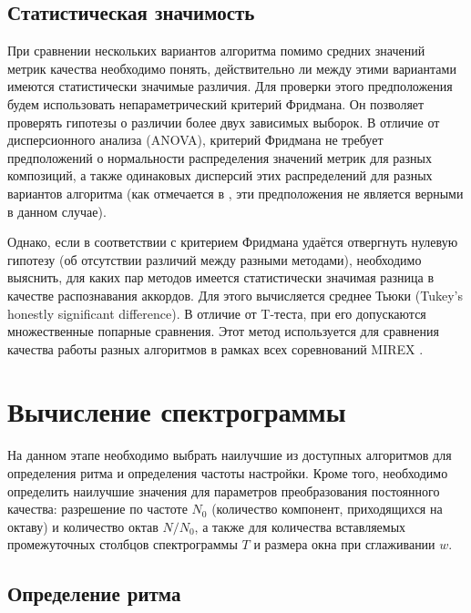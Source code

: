 \subsection{Статистическая значимость}

При сравнении нескольких вариантов алгоритма помимо средних значений метрик
качества необходимо понять, действительно ли между этими вариантами имеются
статистически значимые различия. Для проверки этого предположения будем
использовать непараметрический критерий Фридмана. Он позволяет проверять
гипотезы о различии более двух зависимых выборок. В отличие от дисперсионного
анализа (ANOVA), критерий Фридмана не требует предположений о нормальности
распределения значений метрик для разных композиций, а также одинаковых
дисперсий этих распределений для разных вариантов алгоритма (как отмечается в
\cite{Mauch2010}, эти предположения не является верными в данном случае).

Однако, если в соответствии с критерием Фридмана удаётся отвергнуть нулевую
гипотезу (об отсутствии различий между разными методами), необходимо выяснить,
для каких пар методов имеется статистически значимая разница в качестве
распознавания аккордов. Для этого вычисляется среднее Тьюки (Tukey's honestly
significant difference). В отличие от T-теста, при его допускаются множественные
попарные сравнения. Этот метод используется для сравнения качества работы разных
алгоритмов в рамках всех соревнований MIREX \cite{Downie2008}.

\section{Вычисление спектрограммы} \label{sect3_spectcalc}

На данном этапе необходимо выбрать наилучшие из доступных алгоритмов для
определения ритма и определения частоты настройки. Кроме того, необходимо
определить наилучшие значения для параметров преобразования постоянного
качества: разрешение по частоте $N_0$ (количество компонент, приходящихся на
октаву) и количество октав $N / N_0$, а также для количества вставляемых
промежуточных столбцов спектрограммы $T$ и размера окна при сглаживании $w$.

\subsection{Определение ритма} \label{ssect3_beattrack}

